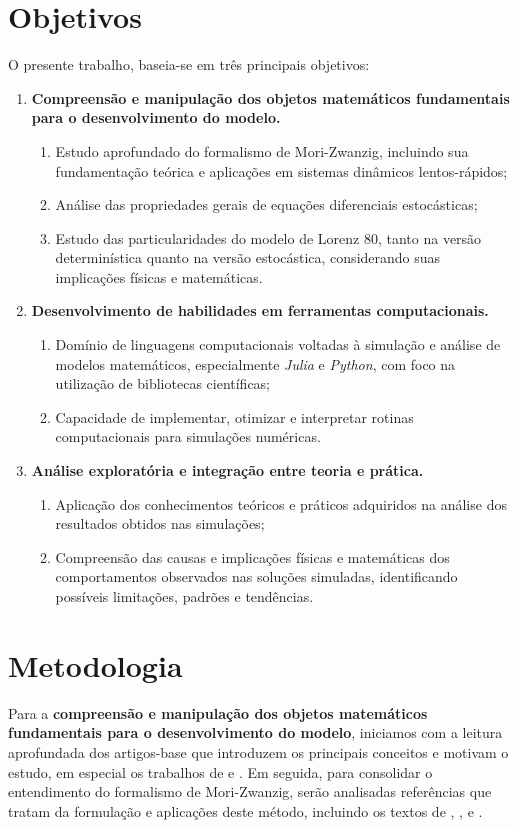 \documentclass[12pt]{article}
\begin{document}
\section*{Objetivos}
O presente trabalho, baseia-se em três principais objetivos:
\begin{enumerate}
    \item \textbf{Compreensão e manipulação dos objetos matemáticos fundamentais para o desenvolvimento do modelo.}
    \begin{enumerate}
        \item Estudo aprofundado do formalismo de Mori-Zwanzig, incluindo sua fundamentação teórica e aplicações em sistemas dinâmicos lentos-rápidos;
        \item Análise das propriedades gerais de equações diferenciais estocásticas;
        \item Estudo das particularidades do modelo de Lorenz 80, tanto na versão determinística quanto na versão estocástica, considerando suas implicações físicas e matemáticas.
    \end{enumerate}

    \item \textbf{Desenvolvimento de habilidades em ferramentas computacionais.}
    \begin{enumerate}
        \item Domínio de linguagens computacionais voltadas à simulação e análise de modelos matemáticos, especialmente \textit{Julia} e \textit{Python}, com foco na utilização de bibliotecas científicas;
        \item Capacidade de implementar, otimizar e interpretar rotinas computacionais para simulações numéricas.
    \end{enumerate}

    \item \textbf{Análise exploratória e integração entre teoria e prática.}
    \begin{enumerate}
        \item Aplicação dos conhecimentos teóricos e práticos adquiridos na análise dos resultados obtidos nas simulações;
        \item Compreensão das causas e implicações físicas e matemáticas dos comportamentos observados nas soluções simuladas, identificando possíveis limitações, padrões e tendências.
    \end{enumerate}
\end{enumerate}


\section*{Metodologia}
Para a \textbf{compreensão e manipulação dos objetos matemáticos fundamentais para o desenvolvimento do modelo}, iniciamos com a leitura aprofundada dos artigos-base que introduzem os principais conceitos e motivam o estudo, em especial os trabalhos de \citet{Chekroun2017} e \citet{Chekroun2021}. Em seguida, para consolidar o entendimento do formalismo de Mori-Zwanzig, serão analisadas referências que tratam da formulação e aplicações deste método, incluindo os textos de \citet{Gouasmi2017}, \citet{Chorin2000}, \citet{Chorin2002} e \citet{Chorin2013}.
\end{document}
